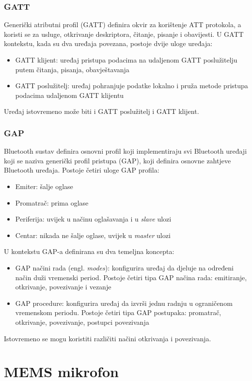 \subsubsection{GATT}
Generički atributni profil (GATT) definira okvir za korištenje ATT protokola, a koristi se za usluge, otkrivanje deskriptora, čitanje, pisanje i obavijesti. U GATT kontekstu, kada su dva uređaja povezana, postoje dvije uloge uređaja:
\begin{itemize}
	\item GATT klijent: uređaj pristupa podacima na udaljenom GATT poslužitelju putem čitanja, pisanja, obavještavanja 
	\item  GATT poslužitelj: uređaj pohranjuje podatke lokalno i pruža metode pristupa podacima udaljenom GATT klijentu
\end{itemize}

Uređaj istovremeno može biti i GATT poslužitelj i GATT klijent.

\subsubsection{GAP}
Bluetooth sustav definira osnovni profil koji implementiraju svi Bluetooth uređaji koji se naziva generički profil pristupa (GAP), koji definira osnovne zahtjeve Bluetooth uređaja. Postoje četiri uloge GAP profila:
\begin{itemize}
	\item Emiter: šalje oglase
	\item Promatrač: prima oglase
	\item Periferija: uvijek u načinu oglašavanja i u \textit{slave} ulozi 
	\item Centar: nikada ne šalje oglase, uvijek u \textit{master} ulozi
\end{itemize}

U kontekstu GAP-a definirana su dva temeljna koncepta:
\begin{itemize}
	\item GAP načini rada (engl. \textit{modes}): konfigurira uređaj da djeluje na određeni način duži vremenski period. Postoje četiri tipa GAP načina rada: emitiranje, otkrivanje, povezivanje i vezanje
	\item GAP procedure: konfigurira uređaj da izvrši jednu radnju u ograničenom vremenskom periodu. Postoje četiri tipa GAP postupaka: promatrač, otkrivanje, povezivanje, postupci povezivanja
\end{itemize}

Istovremeno se mogu koristiti različiti načini otkrivanja i povezivanja.

\section{MEMS mikrofon}